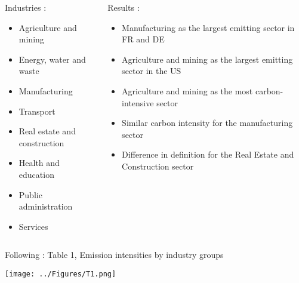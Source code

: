 \documentclass{beamer}
\newcommand\ReduceFont{\fontsize{10}{7.2}\selectfont}
\begin{document}
\begin{frame}{\subsecname}
    \begin{columns}
        \begin{column}{0.5\textwidth}
            Industries :
                \begin{itemize}
                    \item Agriculture and mining
                    \item Energy, water and waste
                    \item Manufacturing
                    \item Transport
                    \item Real estate and construction
                    \item Health and education
                    \item Public administration
                    \item Services
                \end{itemize}
        \end{column}
        \begin{column}{0.5\textwidth}
            \ReduceFont
            Results : 
                \begin{itemize}
                    \item Manufacturing as the largest emitting sector in FR and DE
                    \item Agriculture and mining as the largest emitting sector in the US
                    \item Agriculture and mining as the most carbon-intensive sector
                    \item Similar carbon intensity for the manufacturing sector
                    \item Difference in definition for the Real Estate and Construction sector
                \end{itemize}    
        \end{column}
    \end{columns}
    \hfill \break
    Following : Table 1, Emission intensities by industry groups
\end{frame}

\begin{frame}{\subsecname}
    \begin{center}
        \texttt{[image: ../Figures/T1.png]}    
    \end{center}
\end{frame}
\end{document}
